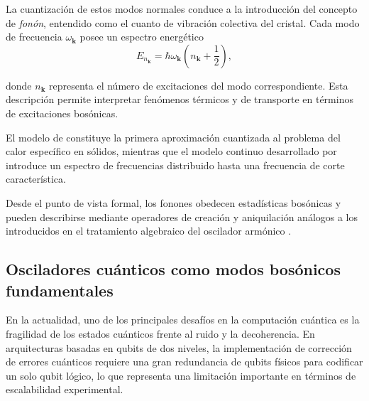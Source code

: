 La cuantización de estos modos normales conduce a la introducción del concepto de \textit{fonón}, entendido como el cuanto de vibración colectiva del cristal. Cada modo de frecuencia $\omega_{\mathbf{k}}$ posee un espectro energético
\vspace{-10pt}
\begin{equation}
E_{n_{\mathbf{k}}} = \hbar \omega_{\mathbf{k}} \left(n_{\mathbf{k}} + \frac{1}{2}\right),
\end{equation}

donde $n_{\mathbf{k}}$ representa el número de excitaciones del modo correspondiente. Esta descripción permite interpretar fenómenos térmicos y de transporte en términos de excitaciones bosónicas.

El modelo de \cite{einstein1907} constituye la primera aproximación cuantizada al problema del calor específico en sólidos, mientras que el modelo continuo desarrollado por  \cite{debye1912} introduce un espectro de frecuencias distribuido hasta una frecuencia de corte característica. %

Desde el punto de vista formal, los fonones obedecen estadísticas bosónicas y pueden describirse mediante operadores de creación y aniquilación análogos a los introducidos en el tratamiento algebraico del oscilador armónico \citep{dirac1930}.%



\subsection{Osciladores cuánticos como modos bosónicos fundamentales}
En la actualidad, uno de los principales desafíos en la computación cuántica es la fragilidad de los estados cuánticos frente al ruido y la decoherencia. En arquitecturas basadas en qubits de dos niveles, la implementación de corrección de errores cuánticos requiere una gran redundancia de qubits físicos para codificar un solo qubit lógico, lo que representa una limitación importante en términos de escalabilidad experimental.

